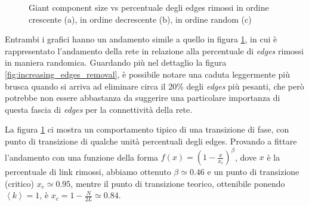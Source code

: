 \begin{figure}[ht]
\begin{subfigure}{.3\textwidth}
            \label{fig:random_edges_removal}
        \end{subfigure}
        \vspace{-3mm}
        \caption{Giant component size vs percentuale degli edges rimossi in ordine crescente (a), in ordine decrescente (b), in ordine random (c)}
        \label{fig:removal_edge}
    \end{figure}
    
    Entrambi i grafici hanno un andamento simile a quello in figura \ref{fig:random_edges_removal}, in cui è rappresentato l'andamento della rete in relazione alla percentuale di \textit{edges} rimossi in maniera randomica. Guardando più nel dettaglio la figura \ref{fig:increasing_edges_removal}, è possibile notare una caduta leggermente più brusca quando si arriva ad eliminare circa il 20\% degli \textit{edges} più pesanti, che però potrebbe non essere abbastanza da suggerire una particolare importanza di questa fascia di \textit{edges} per la connettività della rete.
    
    La figura \ref{fig:random_edges_removal} ci mostra un comportamento tipico di una transizione di fase, con punto di transizione di qualche unità percentuali degli edges. Provando a fittare l'andamento con una funzione della forma $f(x)=(1-\frac{x}{x_c})^\beta$, dove $x$ è la percentuale di link rimossi, abbiamo ottenuto $\beta\simeq0.46$ e un punto di transizione (critico) $x_c\simeq 0.95$, mentre il punto di transizione teorico, ottenibile ponendo $\left<k\right>=1$, è $x_c=1-\frac{N}{2L}\simeq 0.84$.
    
